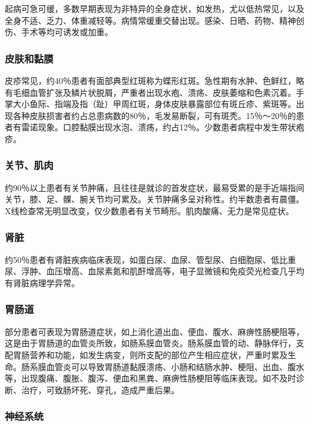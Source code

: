 起病可急可缓，多数早期表现为非特异的全身症状，如发热，尤以低热常见，以及全身不适、乏力、体重减轻等。病情常缓重交替出现。感染、日晒、药物、精神创伤、手术等均可诱发或加重。

\subsubsection{皮肤和黏膜}

皮疹常见，约40％患者有面部典型红斑称为蝶形红斑。急性期有水肿、色鲜红，略有毛细血管扩张及鳞片状脱屑，严重者出现水疱、溃疡、皮肤萎缩和色素沉着。手掌大小鱼际、指端及指（趾）甲周红斑，身体皮肤暴露部位有斑丘疹、紫斑等。出现各种皮肤损害者约占总患病数的80％，毛发易断裂，可有斑秃。15％～20％的患者有雷诺现象。口腔黏膜出现水泡、溃疡，约占12％。少数患者病程中发生带状疱疹。

\subsubsection{关节、肌肉}

约90％以上患者有关节肿痛，且往往是就诊的首发症状，最易受累的是手近端指间关节，膝、足、髁、腕关节均可累及。关节肿痛多呈对称性。约半数患者有晨僵。X线检查常无明显改变，仅少数患者有关节畸形。肌肉酸痛、无力是常见症状。

\subsubsection{肾脏}

约50％患者有肾脏疾病临床表现，如蛋白尿、血尿、管型尿、白细胞尿、低比重尿、浮肿、血压增高、血尿素氮和肌酐增高等，电子显微镜和免疫荧光检查几乎均有肾脏病理学异常。

\subsubsection{胃肠道}

部分患者可表现为胃肠道症状，如上消化道出血、便血、腹水、麻痹性肠梗阻等，这是由于胃肠道的血管炎所致，如肠系膜血管炎。肠系膜血管的动、静脉伴行，支配胃肠营养和功能，如发生病变，则所支配的部位产生相应症状，严重时累及生命。肠系膜血管炎可以导致胃肠道黏膜溃疡、小肠和结肠水肿、梗阻、出血、腹水等，出现腹痛、腹胀、腹泻、便血和黑粪、麻痹性肠梗阻等临床表现。如不及时诊断、治疗，可致肠坏死、穿孔，造成严重后果。

\subsubsection{神经系统}

